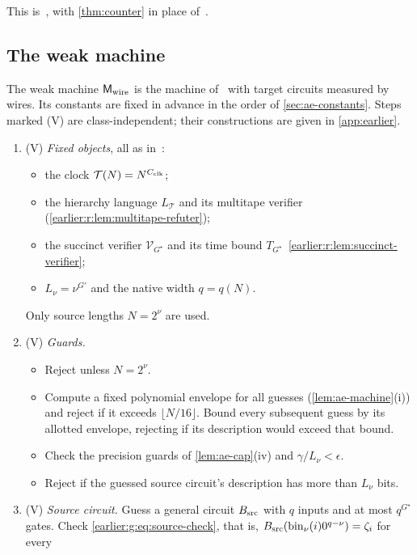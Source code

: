 \documentclass[11pt,letterpaper]{article}
\theoremstyle{definition}
\theoremstyle{remark}
\newcommand{\Tclk}{\mathcal T}
\begin{document}
This is~\cite[Equations~(12) and~(13)]{NagCG}, with \cref{thm:counter}
in place of~\cite[Theorem~3.1]{NagCG}.

\subsection{The weak machine}\label{sec:ae-machine}

The weak machine \(\mathsf M_{\rm wire}\) is the machine
of~\cite[Section~11.4]{NagCG} with target circuits measured by wires.
Its constants are fixed in advance in the order of
\cref{sec:ae-constants}. Steps marked (V) are class-independent;
their constructions are given in \cref{app:earlier}.
\begin{enumerate}[label=(M\arabic*)]
\item (V) \emph{Fixed objects}, all as in~\cite[Section~11.4]{NagCG}:
\begin{itemize}
\item the clock \(\Tclk(N)=N^{C_{\rm clk}}\);
\item the hierarchy language \(L_{\Tclk}\) and its multitape
verifier (\cref{earlier:r:lem:multitape-refuter});
\item the succinct verifier \(\mathcal V_{G^\star}\) and its time
bound \(T_{G^\star}\)~\cref{earlier:r:lem:succinct-verifier};
\item \(L_\nu=\nu^{G'}\) and the native width \(q=q(N)\).
\end{itemize}
Only source lengths \(N=2^\nu\) are used.
\item (V) \emph{Guards.}
\begin{itemize}
\item Reject unless \(N=2^\nu\).
\item Compute a fixed polynomial envelope for all guesses
(\cref{lem:ae-machine}(i)) and reject if it exceeds \(\lfloor N/16\rfloor\).
Bound every subsequent guess by its allotted envelope, rejecting if
its description would exceed that bound.
\item Check the precision guards of \cref{lem:ae-cap}(iv) and
\(\gamma/L_\nu<\epsilon\).
\item Reject if the guessed source circuit's description has more than
\(L_\nu\) bits.
\end{itemize}
\item (V) \emph{Source circuit.} Guess a general circuit
\(B_{\rm src}\) with \(q\) inputs and at most \(q^{G^\star}\) gates.
Check \eqref{earlier:g:eq:source-check}, that is,
\(B_{\rm src}(\mathrm{bin}_\nu(i)0^{q-\nu})=\zeta_i\) for every

\end{enumerate}
\end{document}

